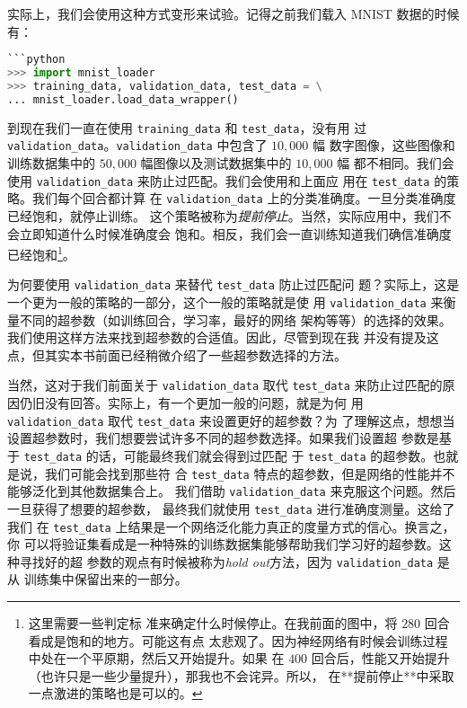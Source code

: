 实际上，我们会使用这种方式变形来试验。记得之前我们载入 MNIST 数据的时候有：

\begin{lstlisting}[language=Python]
```python 
>>> import mnist_loader 
>>> training_data, validation_data, test_data = \
... mnist_loader.load_data_wrapper()
\end{lstlisting}

到现在我们一直在使用 \lstinline!training_data! 和 \lstinline!test_data!，没有用
过 \lstinline!validation_data!。\lstinline!validation_data! 中包含了 $10,000$ 幅
数字图像，这些图像和训练数据集中的 $50,000$ 幅图像以及测试数据集中的 $10,000$ 幅
都不相同。我们会使用 \lstinline!validation_data! 来防止过匹配。我们会使用和上面应
用在 \lstinline!test_data! 的策略。我们每个回合都计算
在 \lstinline!validation_data! 上的分类准确度。一旦分类准确度已经饱和，就停止训练。
这个策略被称为\emph{提前停止}。当然，实际应用中，我们不会立即知道什么时候准确度会
饱和。相反，我们会一直训练知道我们确信准确度已经饱和\footnote{这里需要一些判定标
  准来确定什么时候停止。在我前面的图中，将 $280$ 回合看成是饱和的地方。可能这有点
  太悲观了。因为神经网络有时候会训练过程中处在一个平原期，然后又开始提升。如果
  在 $400$ 回合后，性能又开始提升（也许只是一些少量提升），那我也不会诧异。所以，
  在**提前停止**中采取一点激进的策略也是可以的。}。

为何要使用 \lstinline!validation_data! 来替代 \lstinline!test_data! 防止过匹配问
题？实际上，这是一个更为一般的策略的一部分，这个一般的策略就是使
用 \lstinline!validation_data! 来衡量不同的超参数（如训练回合，学习率，最好的网络
架构等等）的选择的效果。我们使用这样方法来找到超参数的合适值。因此，尽管到现在我
并没有提及这点，但其实本书前面已经稍微介绍了一些超参数选择的方法。

当然，这对于我们前面关于 \lstinline!validation_data! 取代 \lstinline!test_data!
来防止过匹配的原因仍旧没有回答。实际上，有一个更加一般的问题，就是为何
用 \lstinline!validation_data! 取代 \lstinline!test_data! 来设置更好的超参数？为
了理解这点，想想当设置超参数时，我们想要尝试许多不同的超参数选择。如果我们设置超
参数是基于 \lstinline!test_data! 的话，可能最终我们就会得到过匹配
于 \lstinline!test_data!  的超参数。也就是说，我们可能会找到那些符
合 \lstinline!test_data! 特点的超参数，但是网络的性能并不能够泛化到其他数据集合上。
我们借助 \lstinline!validation_data! 来克服这个问题。然后一旦获得了想要的超参数，
最终我们就使用 \lstinline!test_data! 进行准确度测量。这给了我们
在 \lstinline!test_data! 上结果是一个网络泛化能力真正的度量方式的信心。换言之，你
可以将验证集看成是一种特殊的训练数据集能够帮助我们学习好的超参数。这种寻找好的超
参数的观点有时候被称为\emph{hold out}方法，因为 \lstinline!validation_data! 是从
训练集中保留出来的一部分。

